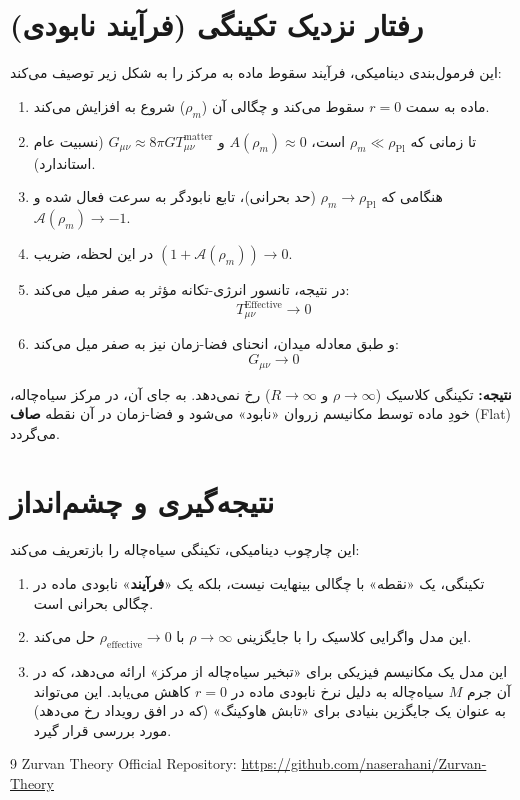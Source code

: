 \documentclass[12pt,a4paper]{article}
\begin{document}
\section{رفتار نزدیک تکینگی (فرآیند نابودی)}
این فرمول‌بندی دینامیکی، فرآیند سقوط ماده به مرکز را به شکل زیر توصیف می‌کند:
\begin{enumerate}
    \item ماده به سمت $r=0$ سقوط می‌کند و چگالی آن ($\rho_m$) شروع به افزایش می‌کند.
    \item تا زمانی که $\rho_m \ll \rho_{\text{Pl}}$ است، $A(\rho_m) \approx 0$ و $G_{\mu\nu} \approx 8\pi G T_{\mu\nu}^{\text{matter}}$ (نسبیت عام استاندارد).
    \item هنگامی که $\rho_m \to \rho_{\text{Pl}}$ (حد بحرانی)، تابع نابودگر به سرعت فعال شده و $\mathcal{A}(\rho_m) \to -1$.
    \item در این لحظه، ضریب $(1 + \mathcal{A}(\rho_m)) \to 0$.
    \item در نتیجه، تانسور انرژی-تکانه مؤثر به صفر میل می‌کند:
    $$ T_{\mu\nu}^{\text{Effective}} \to 0 $$
    \item و طبق معادله میدان، انحنای فضا-زمان نیز به صفر میل می‌کند:
    $$ G_{\mu\nu} \to 0 $$
\end{enumerate}
\textbf{نتیجه:} تکینگی کلاسیک ($\rho \to \infty$ و $R \to \infty$) رخ نمی‌دهد. به جای آن، در مرکز سیاه‌چاله، خودِ ماده توسط مکانیسم زروان «نابود» می‌شود و فضا-زمان در آن نقطه \textbf{صاف} (Flat) می‌گردد.

\section{نتیجه‌گیری و چشم‌انداز}
این چارچوب دینامیکی، تکینگی سیاه‌چاله را بازتعریف می‌کند:
\begin{enumerate}
    \item تکینگی، یک «نقطه» با چگالی بینهایت نیست، بلکه یک «\textbf{فرآیند}» نابودی ماده در چگالی بحرانی است.
    \item این مدل واگرایی کلاسیک را با جایگزینی $\rho \to \infty$ با $\rho_{\text{effective}} \to 0$ حل می‌کند.
    \item این مدل یک مکانیسم فیزیکی برای «تبخیر سیاه‌چاله از مرکز» ارائه می‌دهد، که در آن جرم $M$ سیاه‌چاله به دلیل نرخ نابودی ماده در $r=0$ کاهش می‌یابد. این می‌تواند به عنوان یک جایگزین بنیادی برای «تابش هاوکینگ» (که در افق رویداد رخ می‌دهد) مورد بررسی قرار گیرد.
\end{enumerate}

\begin{thebibliography}{9}
    Zurvan Theory Official Repository: \url{https://github.com/naserahani/Zurvan-Theory}
\end{thebibliography}
\end{document}

